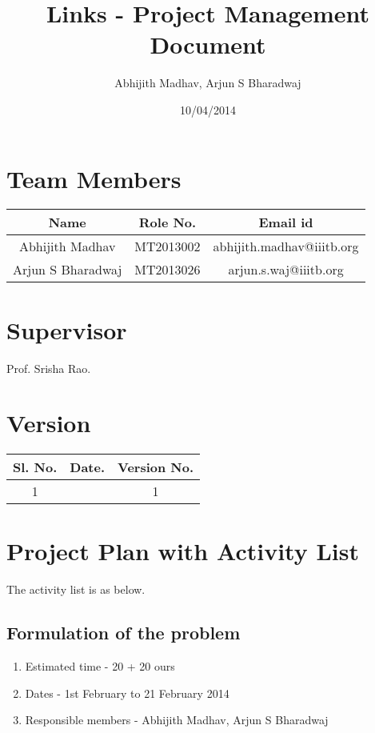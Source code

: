 \documentclass[11pt]{report} %
\title{Links - Project Management Document}
\author{Abhijith Madhav, Arjun S Bharadwaj}
\date{} %
\begin{document}
\maketitle
\section*{Team Members}
\begin{tabular}{ | c | c | c | }
\hline            
  Name & Role No. & Email id \\
  \hline  
  \hline  
  Abhijith Madhav & MT2013002 & abhijith.madhav@iiitb.org \\
  \hline  
  Arjun S Bharadwaj & MT2013026 & arjun.s.waj@iiitb.org \\  
\hline  
\end{tabular}

\maketitle
\section*{Supervisor}
Prof. Srisha Rao.

\maketitle
\section*{Version}
\begin{tabular}{ | c | c | c | }
\hline            
  Sl. No. & Date. & Version No. \\
\hline  
\hline  
  1 & \date{10/04/2014} & 1 \\
\hline  
\end{tabular}

\maketitle
\section*{Project Plan with Activity List}
The activity list is as below.
\subsection*{Formulation of the problem}
\begin{enumerate}
\item Estimated time - 20 + 20 ours 
\item Dates - 1st February to 21 February 2014
\item Responsible members - Abhijith Madhav, Arjun S Bharadwaj
\end{enumerate}
\end{document}
